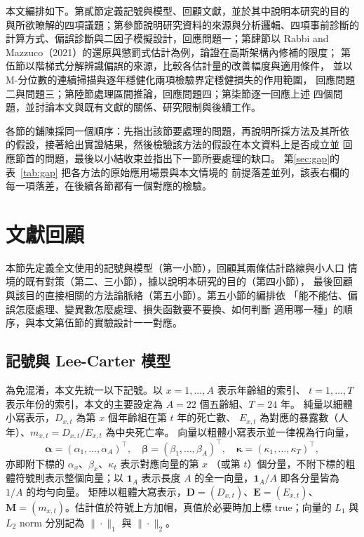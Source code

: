 \documentclass[UTF8, fontset=macnew, a4paper, 12pt]{ctexart}
\begin{document}
本文編排如下。第貳節定義記號與模型、回顧文獻，並於其中說明本研究的目的
與所欲暸解的四項議題；第參節說明研究資料的來源與分析邏輯、四項事前診斷的
計算方式、偏誤診斷與二因子模擬設計，回應問題一；第肆節以 Rabbi and
Mazzuco（2021）的還原與懲罰式估計為例，論證在高斯架構內修補的限度；
第伍節以階梯式分解辨識偏誤的來源，比較各估計量的改善幅度與適用條件，
並以 M-分位數的連續掃描與逐年穩健化兩項檢驗界定穩健損失的作用範圍，
回應問題二與問題三；第陸節處理區間推論，回應問題四；第柒節逐一回應上述
四個問題，並討論本文與既有文獻的關係、研究限制與後續工作。

各節的鋪陳採同一個順序：先指出該節要處理的問題，再說明所採方法及其所依
的假設，接著給出實證結果，然後檢驗該方法的假設在本文資料上是否成立並
回應節首的問題，最後以小結收束並指出下一節所要處理的缺口。
第\ref{sec:gap}的表~\ref{tab:gap} 把各方法的原始應用場景與本文情境的
前提落差並列，該表右欄的每一項落差，在後續各節都有一個對應的檢驗。

\section{文獻回顧}

本節先定義全文使用的記號與模型（第一小節），回顧其兩條估計路線與小人口
情境的既有對策（第二、三小節），據以說明本研究的目的（第四小節），
最後回顧與該目的直接相關的方法論脈絡（第五小節）。第五小節的編排依
「能不能估、偏誤怎麼處理、變異數怎麼處理、損失函數要不要換、如何判斷
適用哪一種」的順序，與本文第伍節的實驗設計一一對應。

\subsection{記號與 Lee-Carter 模型}\label{sec:notation}

為免混淆，本文先統一以下記號。以 $x=1,\dots,A$ 表示年齡組的索引、
$t=1,\dots,T$ 表示年份的索引，本文的主要設定為 $A=22$ 個五齡組、$T=24$ 年。
純量以細體小寫表示，$D_{x,t}$ 為第 $x$ 個年齡組在第 $t$ 年的死亡數、
$E_{x,t}$ 為對應的暴露數（人年）、$m_{x,t}=D_{x,t}/E_{x,t}$ 為中央死亡率。
向量以粗體小寫表示並一律視為行向量，
\[
\boldsymbol{\alpha}=(\alpha_1,\dots,\alpha_A)^{\!\top},\quad
\boldsymbol{\beta}=(\beta_1,\dots,\beta_A)^{\!\top},\quad
\boldsymbol{\kappa}=(\kappa_1,\dots,\kappa_T)^{\!\top},
\]
亦即附下標的 $\alpha_x$、$\beta_x$、$\kappa_t$ 表示對應向量的第 $x$
（或第 $t$）個分量，不附下標的粗體符號則表示整個向量；以 $\mathbf{1}_A$
表示長度 $A$ 的全一向量，$\mathbf{1}_A/A$ 即各分量皆為 $1/A$ 的均勻向量。
矩陣以粗體大寫表示，$\mathbf{D}=(D_{x,t})$、$\mathbf{E}=(E_{x,t})$、
$\mathbf{M}=(m_{x,t})$。估計值於符號上方加帽，真值於必要時加上標
$\text{true}$；向量的 $L_1$ 與 $L_2$ norm 分別記為 $\|\cdot\|_1$ 與
$\|\cdot\|_2$。
\end{document}
